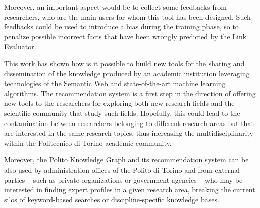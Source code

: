 \documentclass[%
    corpo=13.5pt,
    twoside,
    oldstyle,
    tipotesi=magistrale,
    greek,
    evenboxes
]{toptesi}
\begin{document}
Moreover, an important aspect would be to collect some feedbacks from
researchers, who are the main users for whom this tool has been designed.
Such feedbacks could be used to introduce a bias during the training phase, so
to penalize possible incorrect facts that have been wrongly predicted by the
Link Evaluator.

This work has shown how is it possible to build new tools for the
sharing and dissemination of the knowledge produced by an academic institution
leveraging technologies of the Semantic Web and state-of-the-art machine
learning algorithms.
The recommendation system is a first step in the direction of
offering new tools to the researchers for exploring both new research fields
and the scientific community that study such fields.
Hopefully, this could lead to the contamination between researchers belonging
to different research areas but that are interested in the same research
topics, thus increasing the multidisciplinarity within the Politecnico di
Torino academic community.

Moreover, the Polito Knowledge Graph and its recommendation
system can be also used by administration offices of the Polito di Torino and
from external parties -- such as private organizations or government agencies --
who may be interested in finding expert profiles in a given research
area, breaking the current silos of keyword-based searches or
discipline-specific knowledge bases.




\end{document}
